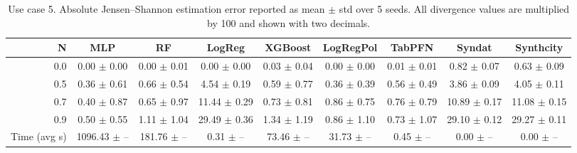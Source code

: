 \begin{table}[ht]
\centering
\scriptsize
\setlength{\tabcolsep}{2.5pt}
\caption{Use case 5. Absolute Jensen--Shannon estimation error reported as mean $\pm$ std over 5 seeds. All divergence values are multiplied by 100 and shown with two decimals.}
\label{tab:uc5_abs_error_no_gt_mean_std_x100_2dec}
\begin{tabular}{rcccccccc}
\toprule
N & MLP & RF & LogReg & XGBoost & LogRegPol & TabPFN & Syndat & Synthcity \\
\midrule
0.0 & 0.00 $\pm$ 0.00 & 0.00 $\pm$ 0.01 & 0.00 $\pm$ 0.00 & 0.03 $\pm$ 0.04 & 0.00 $\pm$ 0.00 & 0.01 $\pm$ 0.01 & 0.82 $\pm$ 0.07 & 0.63 $\pm$ 0.09 \\
0.5 & 0.36 $\pm$ 0.61 & 0.66 $\pm$ 0.54 & 4.54 $\pm$ 0.19 & 0.59 $\pm$ 0.77 & 0.36 $\pm$ 0.39 & 0.56 $\pm$ 0.49 & 3.86 $\pm$ 0.09 & 4.05 $\pm$ 0.11 \\
0.7 & 0.40 $\pm$ 0.87 & 0.65 $\pm$ 0.97 & 11.44 $\pm$ 0.29 & 0.73 $\pm$ 0.81 & 0.86 $\pm$ 0.75 & 0.76 $\pm$ 0.79 & 10.89 $\pm$ 0.17 & 11.08 $\pm$ 0.15 \\
0.9 & 0.50 $\pm$ 0.55 & 1.11 $\pm$ 1.04 & 29.49 $\pm$ 0.36 & 1.34 $\pm$ 1.19 & 0.86 $\pm$ 1.10 & 0.73 $\pm$ 1.07 & 29.10 $\pm$ 0.12 & 29.27 $\pm$ 0.11 \\
Time (avg s) & 1096.43 $\pm$ -- & 181.76 $\pm$ -- & 0.31 $\pm$ -- & 73.46 $\pm$ -- & 31.73 $\pm$ -- & 0.45 $\pm$ -- & 0.00 $\pm$ -- & 0.00 $\pm$ -- \\
\bottomrule
\end{tabular}
\end{table}